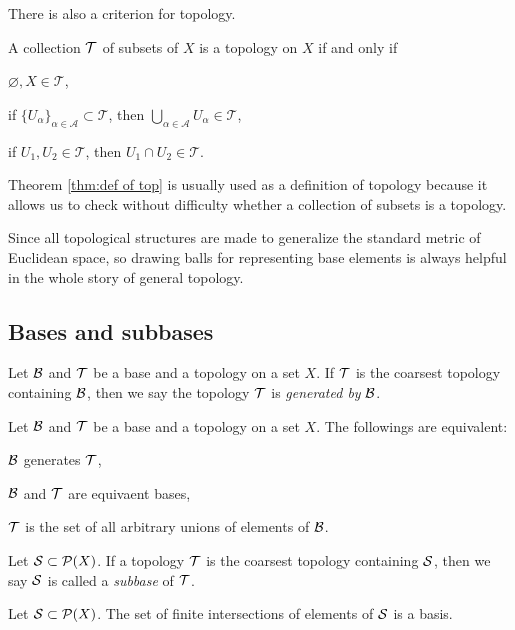 There is also a criterion for topology.

\begin{thm}\label{thm:def of top}
A collection $\mathcal{T}$ of subsets of $X$ is a topology on $X$ if and only if
\begin{cond}
\item $\varnothing,X\in\mathcal{T}$,
\item if $\{U_\alpha\}_{\alpha\in\mathcal{A}}\subset\mathcal{T}$, then $\bigcup_{\alpha\in\mathcal{A}}U_\alpha\in\mathcal{T}$,
\item if $U_1,U_2\in\mathcal{T}$, then $U_1\cap U_2\in\mathcal{T}$.
\end{cond}
\end{thm}
\begin{pf}
\end{pf}
Theorem \ref{thm:def of top} is usually used as a definition of topology because it allows us to check without difficulty whether a collection of subsets is a topology.


Since all topological structures are made to generalize the standard metric of Euclidean space, so drawing balls for representing base elements is always helpful in the whole story of general topology.






\subsection{Bases and subbases}

\begin{defn}
Let $\mathcal{B}$ and $\mathcal{T}$ be a base and a topology on a set $X$.
If $\mathcal{T}$ is the coarsest topology containing $\mathcal{B}$, then we say the topology $\mathcal{T}$ is \emph{generated by} $\mathcal{B}$.
\end{defn}
\begin{thm}
Let $\mathcal{B}$ and $\mathcal{T}$ be a base and a topology on a set $X$.
The followings are equivalent:
\begin{cond}
\item $\mathcal{B}$ generates $\mathcal{T}$,
\item $\mathcal{B}$ and $\mathcal{T}$ are equivaent bases,
\item $\mathcal{T}$ is the set of all arbitrary unions of elements of $\mathcal{B}$.
\end{cond}
\end{thm}

\begin{defn}
Let $\mathcal{S}\subset\mathcal{P}(X)$.
If a topology $\mathcal{T}$ is the coarsest topology containing $\mathcal{S}$, then we say $\mathcal{S}$ is called a \emph{subbase} of $\mathcal{T}$.
\end{defn}
\begin{prop}
Let $\mathcal{S}\subset\mathcal{P}(X)$.
The set of finite intersections of elements of $\mathcal{S}$ is a basis.
\end{prop}

